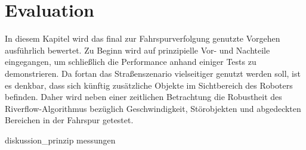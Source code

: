 \chapter{Evaluation \dcfirstauthorshort}
\label{cha:evaluation}

In diesem Kapitel wird das final zur Fahrspurverfolgung genutzte Vorgehen ausführlich bewertet. Zu Beginn wird auf prinzipielle Vor- und Nachteile eingegangen, um schließlich die Performance anhand einiger Tests zu demonstrieren. Da fortan das Straßenszenario vielseitiger genutzt werden soll, ist es denkbar, dass sich künftig zusätzliche Objekte im Sichtbereich des Roboters befinden. Daher wird neben einer zeitlichen Betrachtung die Robustheit des Riverflow-Algorithmus bezüglich Geschwindigkeit, Störobjekten und abgedeckten Bereichen in der Fahrspur getestet.

{diskussion_prinzip}
{messungen}
